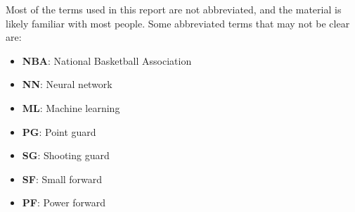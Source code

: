Most of the terms used in this report are not abbreviated, and the material is likely familiar with most people. Some abbreviated terms that may not be clear are:\\
\begin{itemize}
\item\textbf{NBA}: National Basketball Association
\item\textbf{NN}: Neural network
\item\textbf{ML}: Machine learning
\item\textbf{PG}: Point guard
\item\textbf{SG}: Shooting guard
\item\textbf{SF}: Small forward
\item\textbf{PF}: Power forward

\end{itemize}
